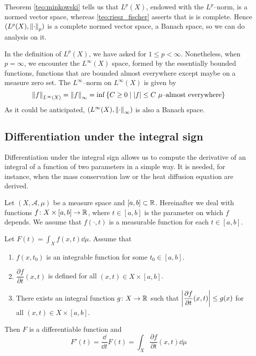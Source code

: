 Theorem \ref{teo:minkowski} tells us that $L^p(X)$, endowed with the
$L^p$--norm, is a normed vector space, whereas \ref{teo:riesz_fischer} asserts
that is is complete. Hence $(L^p(X), \norm{\cdot}_p)$ is a complete normed
vector space, \ie a Banach space, so we can do analysis on it.

In the definition of $L^p(X)$, we have asked for $1 \leq p < \infty$.
Nonetheless, when $p = \infty$, we encounter the $L^\infty(X)$ space, formed by
the essentially bounded functions, \ie functions that are bounded almost
everywhere except maybe on a measure zero set. The $L^\infty$--norm on $L^\infty(X)$ is given by
\[
	\norm{f}_{L^\infty(X)} = 
	\norm{f}_\infty = 
	\inf{\{ C \geq 0 \mid \abs{f} \leq C \ \mu\text{--almost everywhere} \}}
\]
As it could be anticipated, $(L^\infty(X), \norm{\cdot}_\infty)$ is also a Banach space.

\subsection{Differentiation under the integral sign}

Differentiation under the integral sign allows us to compute the derivative of
an integral of a function of two parameters in a simple way. It is needed, for
instance, when the mass conservation law or the heat diffusion equation are
derived. 

Let $(X, \mathcal{A}, \mu)$ be a measure space and $[a, b] \subset \mathbb{R}$.
Hereinafter we deal with functions $f \colon X \times [a,b] \rightarrow \mathbb{R}$,
where $t \in [a, b]$ is the parameter on which $f$ depends. We assume that
$f(\cdot, t)$ is a measurable function for each $t \in [a, b]$.

\begin{theorem}
	\label{theo:differentiation_under_the_integral_sign} Let $F(t) = \int_X
	f(x,t) \dd{\mu}$. Assume that
	\begin{enumerate}[label={(\roman*)}, topsep=0pt]
		\item $f(x,t_0)$ is an integrable function for some $t_0 \in
		[a,b]$.
		\item $\dfrac{\partial f}{\partial t}(x,t)$ is defined for all
		$(x, t) \in X \times [a, b]$.
		\item There exists an integral function $g \colon X \rightarrow \mathbb{R}$
		such that $\abs{\dfrac{\partial f}{\partial t} (x,t)} \leq
		g(x)$ for all $(x, t) \in X \times [a, b]$.
	\end{enumerate}
	Then $F$ is a differentiable function and
	\[
		F'(t) = \frac{\dd}{\dd t} F(t) = \int_X \frac{\partial f}{\partial t}(x,t) \dd{\mu}
	\]
\end{theorem}

